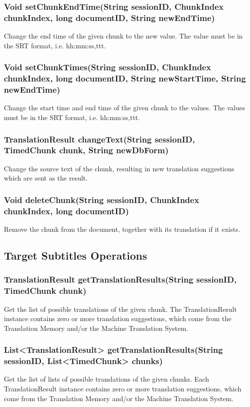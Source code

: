 \subsubsection{Void setChunkEndTime(String sessionID, ChunkIndex chunkIndex, long documentID, String newEndTime)}
Change the end time of the given chunk to the new value. The value must be in the SRT format, i.e. hh:mm:ss,ttt.

\subsubsection{Void setChunkTimes(String sessionID, ChunkIndex chunkIndex, long documentID, String newStartTime, String newEndTime)}
Change the start time and end time of the given chunk to the values. The values must be in the SRT format, i.e. hh:mm:ss,ttt.

\subsubsection{TranslationResult changeText(String sessionID, TimedChunk chunk, String newDbForm)}
Change the source text of the chunk,
resulting in new translation suggestions
which are sent as the result.


\subsubsection{Void deleteChunk(String sessionID, ChunkIndex chunkIndex, long documentID)}
Remove the chunk from the document, together with its translation if it exists.

\subsection{Target Subtitles Operations}

\subsubsection{TranslationResult getTranslationResults(String sessionID, TimedChunk chunk)}
Get the list of possible translations of the given chunk.
The TranslationResult instance contains zero or more translation suggestions, which come from the Translation Memory and/or the Machine Translation System.

\subsubsection{List<TranslationResult> getTranslationResults(String sessionID, List<TimedChunk> chunks)}
Get the list of lists of possible translations of the given chunks.
Each TranslationResult instance contains zero or more translation suggestions, which come from the Translation Memory and/or the Machine Translation System.


